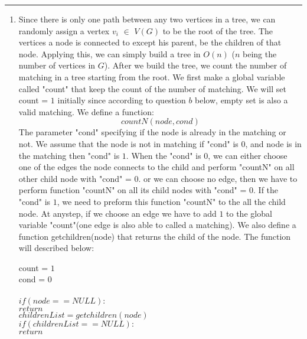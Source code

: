 \documentclass[11pt]{article}
\begin{document}
\hrule


\begin{solution}
\item
\begin{enumerate}
    \item 
        Since there is only one path between any two vertices in a tree, we can randomly assign a vertex $v_i$ $\in$ $V(G)$ to be the root of the tree. The vertices a node is connected to except his parent, be the children of that node. Applying this, we can simply build a tree in $O(n)$ ($n$ being the number of vertices in $G$). 
        \newline
        After we build the tree, we count the number of matching in a tree starting from the root. We first make a global variable called "count" that keep the count of the number of matching. We will set count = $1$ initially since according to question $b$ below, empty set is also a valid matching. We define a function: 
                    $$countN(node,cond)$$
        The parameter "cond" specifying if the node is already in the matching or not. We assume that the node is not in matching if "cond" is $0$, and node is in the matching then "cond" is $1$. When the "cond" is $0$, we can either choose one of the edges the node connects to the child and perform "countN" on all other child node with "cond" = $0$. or we can choose no edge, then we have to perform function "countN" on all its child nodes with "cond" = $0$. If the "cond" is $1$, we need to preform this function "countN" to the all the child node. At anystep, if we choose an edge we have to add $1$ to the global variable "count"(one edge is also able to called a matching). We also define a function getchildren(node) that returns the child of the node.
        \newline 
        The function will described below:
        $$ $$
        \begin{algorithm}
            count = $1$  
                \newline
        \\        cond = $0$  
                \newline
        \\
    	\+
        \\	$if(node == NULL):$\+
        \\     $return$\-
        \\  $childrenList = getchildren(node)$
        \\	$if(childrenList == NULL):$\+
        \\      $return$\-

\end{algorithm}
\end{enumerate}
\end{solution}
\end{document}
